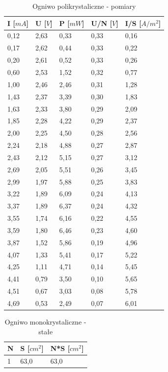 \documentclass[12pt,a4paper]{article}
\begin{document}
\begin{table}[H]
\centering
\caption{Ogniwo polikrystaliczne - pomiary}
\label{poliwyniki}
\begin{tabular}{|p{2cm}|p{2cm}|p{2cm}|p{2cm}|p{2cm}|}
\hline
I {[}$mA${]} & U {[}$V${]} & P  {[}$mW${]} & U/N {[}$V${]} & I/S {[}$A/m^2${]} \\
\hline
0,12 & 2,63 & 0,33 & 0,33 & 0,16 \\
0,17 & 2,62 & 0,44 & 0,33 & 0,22 \\
0,20 & 2,61 & 0,52 & 0,33 & 0,26 \\
0,60 & 2,53 & 1,52 & 0,32 & 0,77 \\
1,00 & 2,46 & 2,46 & 0,31 & 1,28 \\
1,43 & 2,37 & 3,39 & 0,30 & 1,83 \\
1,63 & 2,33 & 3,80 & 0,29 & 2,09 \\
1,85 & 2,28 & 4,22 & 0,29 & 2,37 \\
2,00 & 2,25 & 4,50 & 0,28 & 2,56 \\
2,24 & 2,18 & 4,88 & 0,27 & 2,87 \\
2,43 & 2,12 & 5,15 & 0,27 & 3,12 \\
2,69 & 2,05 & 5,51 & 0,26 & 3,45 \\
2,99 & 1,97 & 5,88 & 0,25 & 3,83 \\
3,22 & 1,89 & 6,09 & 0,24 & 4,13 \\
3,37 & 1,89 & 6,37 & 0,24 & 4,32 \\
3,55 & 1,74 & 6,16 & 0,22 & 4,55 \\
3,59 & 1,80 & 6,46 & 0,23 & 4,60 \\
3,87 & 1,52 & 5,86 & 0,19 & 4,96 \\
4,07 & 1,33 & 5,41 & 0,17 & 5,22 \\
4,25 & 1,11 & 4,71 & 0,14 & 5,45 \\
4,41 & 0,79 & 3,50 & 0,10 & 5,65 \\
4,51 & 0,67 & 3,03 & 0,08 & 5,78 \\
4,69 & 0,53 & 2,49 & 0,07 & 6,01\\
\hline
\end{tabular}
\end{table}

\newpage

\begin{table}[H]
\centering
\caption{Ogniwo monokrystaliczne - stałe}
\label{monostale}
\begin{tabular}{|p{2cm}|p{2cm}|p{2cm}|}
\hline
N & S {[}$cm^2${]} & N*S {[}$cm^2${]}   \\
\hline
1 & 63,0 & 63,0 \\
\hline
\end{tabular}
\end{table}
\end{document}

